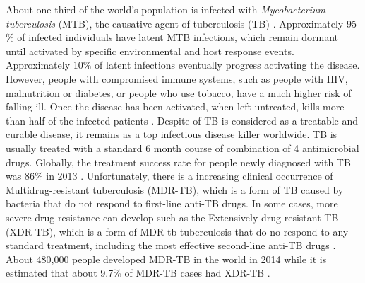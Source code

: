 \documentclass[12pt, a4paper,twoside]{tesi_upf}
\begin{document}
\par About one-third of the world's population is infected with \textit{Mycobacterium tuberculosis} (MTB), the causative agent of tuberculosis (TB) \cite{Lewandowski2015}. Approximately 95$\%$ of infected individuals have latent MTB infections, which remain dormant until activated by specific environmental and host response events. Approximately 10$\%$ of latent infections eventually progress activating the disease. However, people with compromised immune systems, such as people with HIV, malnutrition or diabetes, or people who use tobacco, have a much higher risk of falling ill. Once the disease has been activated, when left untreated, kills more than half of the infected patients \cite{Connell2011}. Despite of TB is considered as a treatable and curable disease, it remains as a top infectious disease killer worldwide. TB is usually treated with a standard 6 month course of combination of 4 antimicrobial drugs. Globally, the treatment success rate for people newly diagnosed with TB was 86$\%$ in 2013 \cite{Lewandowski2015}. Unfortunately, there is a increasing clinical occurrence of Multidrug-resistant tuberculosis (MDR-TB), which is a form of TB caused by bacteria that do not respond to first-line anti-TB drugs. In some cases, more severe drug resistance can develop such as the Extensively drug-resistant TB (XDR-TB), which is a form of MDR-tb tuberculosis that do no respond to any standard treatment, including the most effective second-line anti-TB drugs \cite{Berry2009}. About 480,000 people developed MDR-TB in the world in 2014 while it is estimated that about 9.7$\%$ of MDR-TB cases had XDR-TB \cite{Lewandowski2015}.
\end{document}
